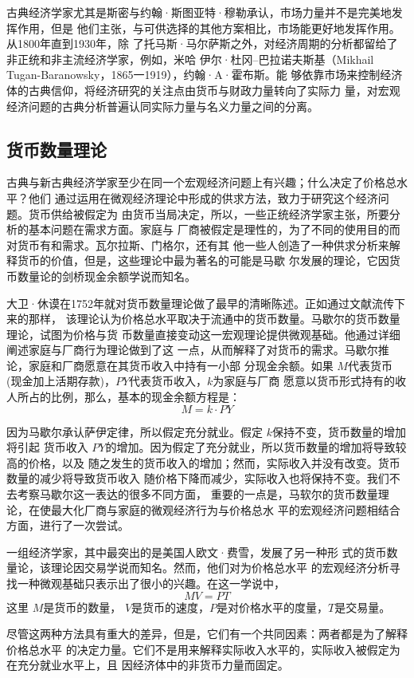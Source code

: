 古典经济学家尤其是斯密与约翰·斯图亚特·穆勒承认，市场力量并不是完美地发挥作用，但是
他们主张，与可供选择的其他方案相比，市场能更好地发挥作用。从1800年直到1930年，除
了托马斯·马尔萨斯之外，对经济周期的分析都留给了非正统和非主流经济学家，例如，米哈
伊尔·杜冈--巴拉诺夫斯基（Mikhail Tugan-Baranowsky，1865一1919），约翰·A·霍布斯。能
够依靠市场来控制经济体的古典信仰，将经济研究的关注点由货币与财政力量转向了实际力
量，对宏观经济问题的古典分析普遍认同实际力量与名义力量之间的分离。


\subsection{货币数量理论}

古典与新古典经济学家至少在同一个宏观经济问题上有兴趣；什么决定了价格总水平？他们
通过运用在微观经济理论中形成的供求方法，致力于研究这个经济问题。货币供给被假定为
由货币当局决定，所以，一些正统经济学家主张，所要分析的基本问题在需求方面。家庭与
厂商被假定是理性的，为了不同的使用目的而对货币有和需求。瓦尔拉斯、门格尔，还有其
他一些人创造了一种供求分析来解释货币的价值，但是，这些理论中最为著名的可能是马歇
尔发展的理论，它因货币数量论的剑桥现金余额学说而知名。

大卫·休谟在1752年就对货币数量理论做了最早的清晰陈述。正如通过文献流传下来的那样，
该理论认为价格总水平取决于流通中的货币数量。马歇尔的货币数量理论，试图为价格与货
币数量直接变动这一宏观理论提供微观基础。他通过详细阐述家庭与厂商行为理论做到了这
一点，从而解释了对货币的需求。马歇尔推论，家庭和厂商愿意在其货币收入中持有一小部
分现金余额。如果 $M$代表货币(现金加上活期存款)，$PY$代表货币收入，$k$为家庭与厂商
愿意以货币形式持有的收人所占的比例，那么，基本的现金余额方程是：
\[ M = k \cdot PY\]

因为马歇尔承认萨伊定律，所以假定充分就业。假定 $k$保持不变，货币数量的增加将引起
货币收入 $PY$的增加。因为假定了充分就业，所以货币数量的增加将导致较高的价格，以及
随之发生的货币收入的增加；然而，实际收入并没有改变。货币数量的减少将导致货币收入
随价格下降而减少，实际收入也将保持不变。我们不去考察马歇尔这一表达的很多不同方面，
重要的一点是，马软尔的货币数量理论，在使最大化厂商与家庭的微观经济行为与价格总水
平的宏观经济问题相结合方面，进行了一次尝试。

一组经济学家，其中最突出的是美国人欧文·费雪，发展了另一种形
式的货币数量论，该理论因交易学说而知名。然而，他们对为价格总水平
的宏观经济分析寻找一种微观基础只表示出了很小的兴趣。在这一学说中，
\[ MV = PT \]
这里 $M$是货币的数量， $V$是货币的速度，$P$是对价格水平的度量，$T$是交易量。

尽管这两种方法具有重大的差异，但是，它们有一个共同因素：两者都是为了解释价格总水平
的决定力量。它们不是用来解释实际收入水平的，实际收入被假定为在充分就业水平上，且
因经济体中的非货币力量而固定。

